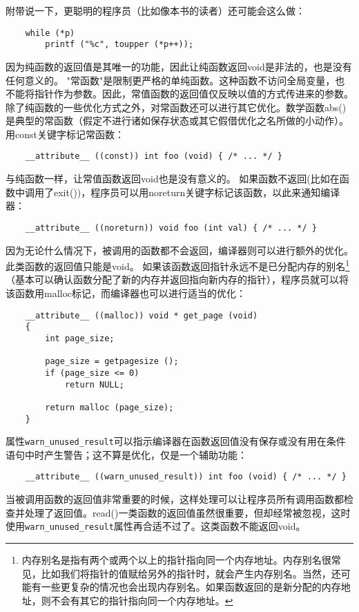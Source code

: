 附带说一下，更聪明的程序员（比如像本书的读者）还可能会这么做：
\begin{lstlisting}
    while (*p)
        printf ("%c", toupper (*p++));
\end{lstlisting}

因为纯函数的返回值是其唯一的功能，因此让纯函数返回void是非法的，也是没有任何意义的。
"常函数"是限制更严格的单纯函数。这种函数不访问全局变量，也不能将指针作为参数。因此，常值函数的返回值仅反映以值的方式传进来的参数。除了纯函数的一些优化方式之外，对常函数还可以进行其它优化。数学函数abs()是典型的常函数（假定不进行诸如保存状态或其它假借优化之名所做的小动作）。用const关键字标记常函数：
\begin{lstlisting}
	__attribute__ ((const)) int foo (void) { /* ... */ }
\end{lstlisting}
与纯函数一样，让常值函数返回void也是没有意义的。
如果函数不返回(比如在函数中调用了exit())，程序员可以用noreturn关键字标记该函数，以此来通知编译器：
\begin{lstlisting}
	__attribute__ ((noreturn)) void foo (int val) { /* ... */ }
\end{lstlisting}
因为无论什么情况下，被调用的函数都不会返回，编译器则可以进行额外的优化。此类函数的返回值只能是void。
如果该函数返回指针永远不是已分配内存的别名\footnote{内存别名是指有两个或两个以上的指针指向同一个内存地址。内存别名很常见，比如我们将指针的值赋给另外的指针时，就会产生内存别名。当然，还可能有一些更复杂的情况也会出现内存别名。如果函数返回的是新分配的内存地址，则不会有其它的指针指向同一个内存地址。}（基本可以确认函数分配了新的内存并返回指向新内存的指针），程序员就可以将该函数用malloc标记，而编译器也可以进行适当的优化：
\begin{lstlisting}
    __attribute__ ((malloc)) void * get_page (void)
    {
        int page_size;
        
        page_size = getpagesize ();
        if (page_size <= 0)
            return NULL;
        
        return malloc (page_size);
    }

\end{lstlisting}
属性\verb+warn_unused_result+可以指示编译器在函数返回值没有保存或没有用在条件语句中时产生警告；这不算是优化，仅是一个辅助功能：
\begin{lstlisting}
    __attribute__ ((warn_unused_result)) int foo (void) { /* ... */ }
\end{lstlisting}
当被调用函数的返回值非常重要的时候，这样处理可以让程序员所有调用函数都检查并处理了返回值。read()一类函数的返回值虽然很重要，但却经常被忽视，这时使用\verb+warn_unused_result+属性再合适不过了。这类函数不能返回void。

